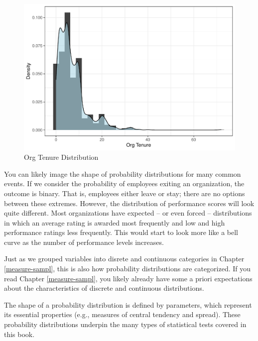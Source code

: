 \documentclass[]{book}
\begin{document}
\begin{figure}

{\centering \includegraphics{People_Analytics_Lifecycle_files/figure-latex/org-tenure-dist-1} 

}

\caption{Org Tenure Distribution}\label{fig:org-tenure-dist}
\end{figure}

You can likely image the shape of probability distributions for many common events. If we consider the probability of employees exiting an organization, the outcome is binary. That is, employees either leave or stay; there are no options between these extremes. However, the distribution of performance scores will look quite different. Most organizations have expected -- or even forced -- distributions in which an average rating is awarded most frequently and low and high performance ratings less frequently. This would start to look more like a bell curve as the number of performance levels increases.

Just as we grouped variables into disrete and continuous categories in Chapter \ref{measure-sampl}, this is also how probability distributions are categorized. If you read Chapter \ref{measure-sampl}, you likely already have some a priori expectations about the characteristics of discrete and continuous distributions.

The shape of a probability distribution is defined by parameters, which represent its essential properties (e.g., measures of central tendency and spread). These probability distributions underpin the many types of statistical tests covered in this book.
\end{document}
